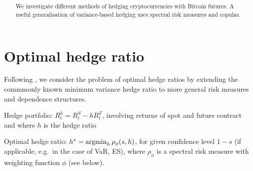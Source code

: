 \documentclass[square]{article} %
\theoremstyle{plain}
\theoremstyle{definition} %
\begin{document}
\setlength{\boxlength}{0.95\textwidth} %
\title{\large{\bf{}}} %
\author{{\normalsize\bf{}}}%
\thispagestyle{empty}
\addtocounter{page}{1}
\maketitle
\begin{abstract}
  We investigate different methods of hedging cryptocurrencies with
  Bitcoin futures. A useful generalisation of variance-based hedging
  uses spectral risk measures and copulas. 
\end{abstract}
\vspace{.5cm}
\def\contentsname{Contents}
\tableofcontents
\vspace{.5cm}

\section{Optimal hedge ratio}
\label{sec:optimal-hedge-ratio}

Following \citep{Barbi2014}, we consider the problem of optimal
hedge ratios by extending the commmonly known minimum variance hedge
ratio to more general risk measures and dependence
structures.\medskip

Hedge portfolio: $R_t^h = R_t^S - h R_t^F$, involving returns of spot
and future contract and where $h$ is the hedge ratio

Optimal hedge ratio: $h^\ast = \argmin_h \rho_\phi(s,h)$, for given
confidence level $1-s$ (if applicable, e.g.\ in the case of VaR, ES),
where $\rho_\phi$ is a spectral risk measure with weighting function
$\phi$ (see below).
\end{document}
